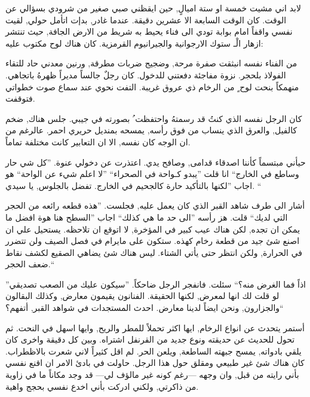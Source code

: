 \documentclass[12pt, a4paper]{article}
\begin{document}
\begin{otherlanguage}{arabic}
لابد اني مشيت خمسة او ستة اميالٍ, حين ايقظني صبي صغير من شرودي بسؤالي عن الوقت. كان الوقت السابعة الا عشرين دقيقة.
عندما غادر, بدإت اتأمل حولي, لقيت نفسي واقفاً امام بوابة تودي الى فناء يحيط به شريط من الارض الجافة, حيث تنتشر
ازهار الْـ ستوك الارجوانية والجيرانيوم القرمزية. كان هناك لوح مكتوب عليه:

\begin{center}
\end{center}

من الفناء نفسه انبثقت صفرة مرحة, وضجيج ضربات مطرقة, ورنين معدني حاد للتقاء الفولاذ بلحجر. نزوة مفاجئة دفعتني للدخول.
كان رجلٌ جالساً مديراً ظهرهُ باتجاهي. منهمكاً بنحت لوح ٍ  من الرخام ذي عروق غريبة. التفت نحوي عند سماع صوت خطواتي فتوقفت. \medbreak


كان الرجل نفسه الذي كنتُ  قد رسمتهُ واحتفظت ُ بصورته في جيبي. جلس هناك, ضخم كالفيل, والعرق الذي ينساب من فوق رأسه, يمسحه
بمنديل حريري احمر. عالرغم من ان الوجه كان نفسه, الا ان التعابير كانت مختلفة تماماً. \medbreak

حيأني مبتسماً كأننا اصدقاء قدامى, وصافح يدي. اعتذرت عن دخولي عنوة. ”كل شي حار وساطع في الخارج“ انا قلت ”يبدو  كـواحة في الصحراء“
”لا اعلم شيء عن الواحة“  هو اجاب ”لكنها بالتأكيد حارة كالجحيم في الخارج. تفضل بالجلوس, يا سيدي. “ \medbreak

أشار الى طرف شاهد القبر الذي كان يعمل عليه, فجلست. ”هذه قطعه رائعه من الحجر التي لديك“ قلت. هز رأسه ”الى حد ما هي كذلك“ 
اجاب ”السطح هنا هوة افضل ما يمكن ان تجده, لكن هناك عيب كبير في المؤخرة, لا اتوقع ان تلاحظه. يستحيل علي ان اصنع شئ جيد من قطعة 
رخام كهذه.  ستكون على مايرام في فصل الصيف ولن تتضرر في الحرارة, ولكن انتظر حتى يأتي الشتاء. ليس هناك شئ يضاهي الصقيع لكشف نقاط
ضعف الحجر.“  \medbreak


”اذاً فما الغرض منه؟“  سئلت. فانفجر الرجل ضاحكاً. ”سيكون عليك من الصعب تصديقي لو قلت لك انها لمعرض, لكنها الحقيقة. الفنانون يقيمون
معارض, وكذلك البقالون والجزارون, ونحن ايضاً لدينا معارض. احدث المستجدات في شواهد القبر, أتفهم؟“   \medbreak

أستمر يتحدث عن انواع الرخام, ايها اكثر تحملاً للمطر والريح, وايها اسهل في النحت. ثم تحول للحديث عن حديقته ونوع جديد من القرنفل اشتراه.
وبين كل دقيقة واخرى كان يلقي بادواته, يمسح جبهته الساطعة, ويلعن الحر. لم اقل كثيراً لاني شعرت بالاظطراب. كان هناك شئ غير طبيعي 
ومقلق حول هذا الرجل. حاولت في بادئ الامر ان اقنع نفسي بأني رايته من قبل, وان وجهه —رغم كونه غير مالؤف لي— قد وجد مكاناً
ما في زاوية من ذاكرتي, ولكني ادركت بأني اخدع نفسي بحجج واهية. \medbreak


\end{otherlanguage}
\end{document}
